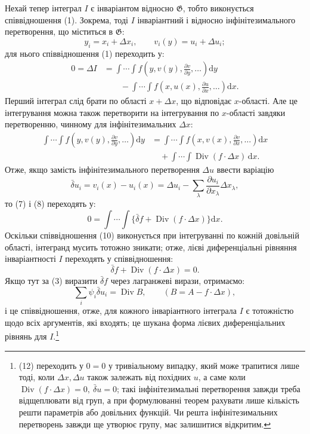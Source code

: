 \documentclass[11pt]{article}
\providecommand{\G}{\mathfrak G}
\providecommand{\D}{\Delta}
\providecommand{\p}{\partial}
\providecommand{\dd}{\mathrm d}
\DeclareMathOperator{\Div}{Div}
\providecommand{\bd}{\bar{\delta}}
\begin{document}
Нехай тепер інтеграл \(I\) є інваріантом відносно \(\G\), тобто виконується співвідношення (1). Зокрема, тоді \(I\) інваріантний і відносно інфінітезимального перетворення, що міститься в \(\G\):
\[
y_i=x_i+\D x_i,\qquad v_i(y)=u_i+\D u_i;
\]
для нього співвідношення (1) переходить у:
\begin{equation}
\begin{aligned}
0=\D I
&=\int\!\cdots\!\int f\!\left(y,v(y),\frac{\p v}{\p y},\ldots\right)\dd y\\
&\qquad-\int\!\cdots\!\int f\!\left(x,u(x),\frac{\p u}{\p x},\ldots\right)\dd x.
\end{aligned}
\tag{7}
\end{equation}
Перший інтеграл слід брати по області \(x+\D x\), що відповідає \(x\)-області. Але це інтегрування можна також перетворити на інтегрування по \(x\)-області завдяки перетворенню, чинному для інфінітезимальних \(\D x\):
\begin{equation}
\begin{aligned}
\int\!\cdots\!\int f\!\left(y,v(y),\frac{\p v}{\p y},\ldots\right)\dd y
&=\int\!\cdots\!\int f\!\left(x,v(x),\frac{\p v}{\p x},\ldots\right)\dd x\\
&\quad+\int\!\cdots\!\int \Div(f\cdot \D x)\,\dd x.
\end{aligned}
\tag{8}
\end{equation}
Отже, якщо замість інфінітезимального перетворення \(\D u\) ввести варіацію
\begin{equation}
\bd u_i=v_i(x)-u_i(x)=\D u_i-\sum_\lambda\frac{\p u_i}{\p x_\lambda}\D x_\lambda,
\tag{9}
\end{equation}
то (7) і (8) переходять у:
\begin{equation}
0=\int\!\cdots\!\int\{\bd f+\Div(f\cdot\D x)\}\dd x.
\tag{10}
\end{equation}
Оскільки співвідношення (10) виконується при інтегруванні по кожній довільній області, інтегранд мусить тотожно зникати; отже, лієві диференціальні рівняння інваріантності \(I\) переходять у співвідношення:
\begin{equation}
\bd f+\Div(f\cdot\D x)=0.
\tag{11}
\end{equation}
Якщо тут за (3) виразити \(\bd f\) через лагранжеві вирази, отримаємо:
\begin{equation}
\sum_i\psi_i\bd u_i=\Div B,\qquad (B=A-f\cdot\D x),
\tag{12}
\end{equation}
і це співвідношення, отже, для кожного інваріантного інтеграла \(I\) є тотожністю щодо всіх аргументів, які входять; це шукана форма лієвих диференціальних рівнянь для \(I\).\footnote{(12) переходить у \(0=0\) у тривіальному випадку, який може трапитися лише тоді, коли \(\D x,\D u\) також залежать від похідних \(u\), а саме коли \(\Div(f\cdot\D x)=0,\ \bd u=0\); такі інфінітезимальні перетворення завжди треба відщеплювати від груп, а при формулюванні теорем рахувати лише кількість решти параметрів або довільних функцій. Чи решта інфінітезимальних перетворень завжди ще утворює групу, має залишитися відкритим.}
\end{document}
